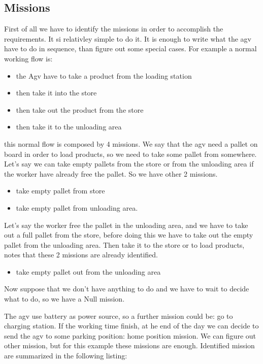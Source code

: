 %
\subsection{Missions}
First of all we have to identify the missions in order to accomplish the requirements. It si relativley simple to do it. It is enough to write what the agv have to do in sequence, than figure out some special cases.
For example a normal working flow is: 
\begin{itemize}
	\item the Agv have to take a product from the loading station
	\item then take it into the store
	\item then take out the product from the store
	\item then take it to the unloading area
\end{itemize}
this normal flow is composed by 4 missions. We say that the agv need a pallet on board in order to load products, so we need to take some pallet from somewhere. Let's say we can take empty pallets from the store or from the unloading area if the worker have already free the pallet. So we have other 2 missions.
\begin{itemize}
	\item take empty pallet from store
	\item take empty pallet from unloading area.
\end{itemize}
Let's say the worker free the pallet in the unloading area, and we have to take out a full pallet from the store, before doing this we have to take out the empty pallet from the unloading area. Then take it to the store or to load products, notes that these 2 missions are already identified.
\begin{itemize}
	\item take empty pallet out from the unloading area
\end{itemize}

Now suppose that we don't have anything to do and we have to wait to decide what to do, so we have a Null mission. 

The agv use battery as power source, so a further mission could be: go to charging station. If the working time finish, at he end of the day we can decide to send the agv to some parking position: home position mission.
We can figure out other mission, but for this example these missions are enough. Identified mission are summarized in the following listing:

